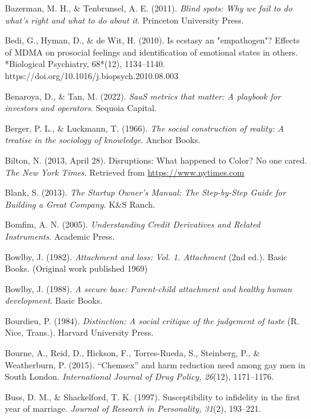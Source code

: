\begin{thebibliography}{}
    Bazerman, M. H., \& Tenbrunsel, A. E. (2011). \textit{Blind spots: Why we fail to do what's right and what to do about it}. Princeton University Press.

    Bedi, G., Hyman, D., \& de Wit, H. (2010). Is ecstasy an "empathogen"? Effects of MDMA on prosocial feelings and identification of emotional states in others. *Biological Psychiatry, 68*(12), 1134–1140. https://doi.org/10.1016/j.biopsych.2010.08.003

    Benaroya, D., \& Tan, M. (2022). \textit{SaaS metrics that matter: A playbook for investors and operators}. Sequoia Capital.
    
    Berger, P. L., \& Luckmann, T. (1966). \textit{The social construction of reality: A treatise in the sociology of knowledge}. Anchor Books.

    Bilton, N. (2013, April 28). Disruptions: What happened to Color? No one cared. \textit{The New York Times}. Retrieved from \url{https://www.nytimes.com}

    Blank, S. (2013). \textit{The Startup Owner's Manual: The Step-by-Step Guide for Building a Great Company}. K\&S Ranch.

    Bomfim, A. N. (2005). \textit{Understanding Credit Derivatives and Related Instruments}. Academic Press.

    Bowlby, J. (1982). \textit{Attachment and loss: Vol. 1. Attachment} (2nd ed.). Basic Books. (Original work published 1969)

    Bowlby, J. (1988). \textit{A secure base: Parent-child attachment and healthy human development}. Basic Books.
    
    Bourdieu, P. (1984). \textit{Distinction: A social critique of the judgement of taste} (R. Nice, Trans.). Harvard University Press.

    Bourne, A., Reid, D., Hickson, F., Torres-Rueda, S., Steinberg, P., \& Weatherburn, P. (2015). “Chemsex” and harm reduction need among gay men in South London. \textit{International Journal of Drug Policy, 26}(12), 1171–1176.
    
    Buss, D. M., \& Shackelford, T. K. (1997). Susceptibility to infidelity in the first year of marriage. \textit{Journal of Research in Personality, 31}(2), 193–221.


\end{thebibliography}

